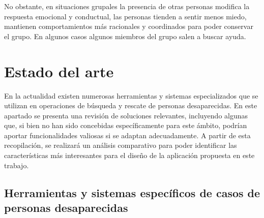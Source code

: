     No obstante, en situaciones grupales la presencia de otras personas modifica la respuesta emocional y conductual, las personas tienden a sentir menos miedo, mantienen comportamientos más racionales y coordinados para poder conservar el grupo. En algunos casos algunos miembros del grupo salen a buscar ayuda.



    
    \section{Estado del arte}\label{estadoArte}
    
    
    
    En la actualidad existen numerosas herramientas y sistemas especializados que se utilizan en operaciones de búsqueda y rescate de personas desaparecidas. En este apartado se presenta una revisión de soluciones relevantes, incluyendo algunas que, si bien no han sido concebidas específicamente para este ámbito, podrían aportar funcionalidades valiosas si se adaptan adecuadamente. A partir de esta recopilación, se realizará un análisis comparativo para poder identificar las características más interesantes para el diseño de la aplicación propuesta en este trabajo. 
    
    \subsection{Herramientas y sistemas específicos de casos de personas desaparecidas}
    
